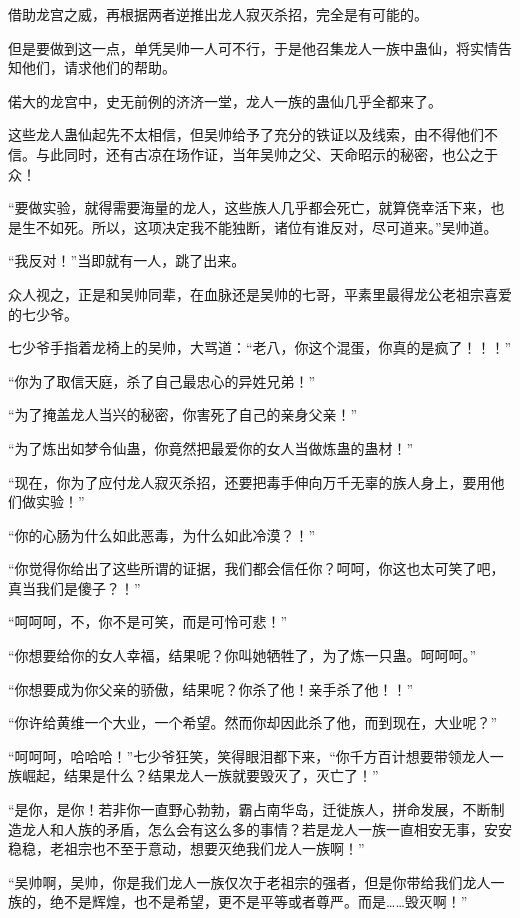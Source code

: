 \begin{this_body}
借助龙宫之威，再根据两者逆推出龙人寂灭杀招，完全是有可能的。

但是要做到这一点，单凭吴帅一人可不行，于是他召集龙人一族中蛊仙，将实情告知他们，请求他们的帮助。

偌大的龙宫中，史无前例的济济一堂，龙人一族的蛊仙几乎全都来了。

这些龙人蛊仙起先不太相信，但吴帅给予了充分的铁证以及线索，由不得他们不信。与此同时，还有古凉在场作证，当年吴帅之父、天命昭示的秘密，也公之于众！

“要做实验，就得需要海量的龙人，这些族人几乎都会死亡，就算侥幸活下来，也是生不如死。所以，这项决定我不能独断，诸位有谁反对，尽可道来。”吴帅道。

“我反对！”当即就有一人，跳了出来。

众人视之，正是和吴帅同辈，在血脉还是吴帅的七哥，平素里最得龙公老祖宗喜爱的七少爷。

七少爷手指着龙椅上的吴帅，大骂道：“老八，你这个混蛋，你真的是疯了！！！”

“你为了取信天庭，杀了自己最忠心的异姓兄弟！”

“为了掩盖龙人当兴的秘密，你害死了自己的亲身父亲！”

“为了炼出如梦令仙蛊，你竟然把最爱你的女人当做炼蛊的蛊材！”

“现在，你为了应付龙人寂灭杀招，还要把毒手伸向万千无辜的族人身上，要用他们做实验！”

“你的心肠为什么如此恶毒，为什么如此冷漠？！”

“你觉得你给出了这些所谓的证据，我们都会信任你？呵呵，你这也太可笑了吧，真当我们是傻子？！”

“呵呵呵，不，你不是可笑，而是可怜可悲！”

“你想要给你的女人幸福，结果呢？你叫她牺牲了，为了炼一只蛊。呵呵呵。”

“你想要成为你父亲的骄傲，结果呢？你杀了他！亲手杀了他！！”

“你许给黄维一个大业，一个希望。然而你却因此杀了他，而到现在，大业呢？”

“呵呵呵，哈哈哈！”七少爷狂笑，笑得眼泪都下来，“你千方百计想要带领龙人一族崛起，结果是什么？结果龙人一族就要毁灭了，灭亡了！”

“是你，是你！若非你一直野心勃勃，霸占南华岛，迁徙族人，拼命发展，不断制造龙人和人族的矛盾，怎么会有这么多的事情？若是龙人一族一直相安无事，安安稳稳，老祖宗也不至于意动，想要灭绝我们龙人一族啊！”

“吴帅啊，吴帅，你是我们龙人一族仅次于老祖宗的强者，但是你带给我们龙人一族的，绝不是辉煌，也不是希望，更不是平等或者尊严。而是……毁灭啊！”


\end{this_body}
